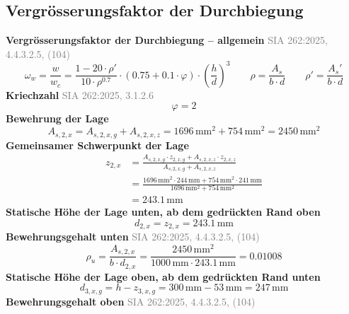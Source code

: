 \documentclass[11pt,a4paper]{article}
\newcommand{\normref}[1]{{\small\textcolor{gray}{#1}}}
\begin{document}
\subsection{Vergrösserungsfaktor der Durchbiegung}
\noindent\textbf{Vergrösserungsfaktor der Durchbiegung – allgemein} \hfill \normref{SIA 262:2025, 4.4.3.2.5, (104)}
\begin{equation*}
\omega_w = \frac{w}{w_c} = \frac{1 - 20 \cdot \rho'}{10 \cdot \rho^{0.7}} \cdot \left(0.75 + 0.1 \cdot \varphi\right) \cdot \left(\frac{h}{d}\right)^{3} \qquad \rho = \frac{A_s}{b \cdot d} \qquad \rho' = \frac{A_s'}{b \cdot d}
\end{equation*}
\noindent\textbf{Kriechzahl} \hfill \normref{SIA 262:2025, 3.1.2.6}
\begin{equation*}
\varphi = 2
\end{equation*}
\noindent\textbf{Bewehrung der Lage}
\begin{equation*}
A_{s,2,x} = A_{s,2,x,g} + A_{s,2,x,z} = 1696\,\mathrm{mm}^{2} + 754\,\mathrm{mm}^{2} = 2450\,\mathrm{mm}^{2}
\end{equation*}
\noindent\textbf{Gemeinsamer Schwerpunkt der Lage}
\begin{equation*}
\begin{aligned}
  z_{2,x} &= \frac{A_{s,2,x,g} \cdot z_{2,x,g} + A_{s,2,x,z} \cdot z_{2,x,z}}{A_{s,2,x,g} + A_{s,2,x,z}} \\
  &= \frac{1696\,\mathrm{mm}^{2} \cdot 244\,\mathrm{mm} + 754\,\mathrm{mm}^{2} \cdot 241\,\mathrm{mm}}{1696\,\mathrm{mm}^{2} + 754\,\mathrm{mm}^{2}} \\
  &= 243.1\,\mathrm{mm}
\end{aligned}
\end{equation*}
\noindent\textbf{Statische Höhe der Lage unten, ab dem gedrückten Rand oben}
\begin{equation*}
d_{2,x} = z_{2,x} = 243.1\,\mathrm{mm}
\end{equation*}
\noindent\textbf{Bewehrungsgehalt unten} \hfill \normref{SIA 262:2025, 4.4.3.2.5, (104)}
\begin{equation*}
\rho_{u} = \frac{A_{s,2,x}}{b \cdot d_{2,x}} = \frac{2450\,\mathrm{mm}^{2}}{1000\,\mathrm{mm} \cdot 243.1\,\mathrm{mm}} = 0.01008
\end{equation*}
\noindent\textbf{Statische Höhe der Lage oben, ab dem gedrückten Rand unten}
\begin{equation*}
d_{3,x,g} = h - z_{3,x,g} = 300\,\mathrm{mm} - 53\,\mathrm{mm} = 247\,\mathrm{mm}
\end{equation*}
\noindent\textbf{Bewehrungsgehalt oben} \hfill \normref{SIA 262:2025, 4.4.3.2.5, (104)}
\end{document}
